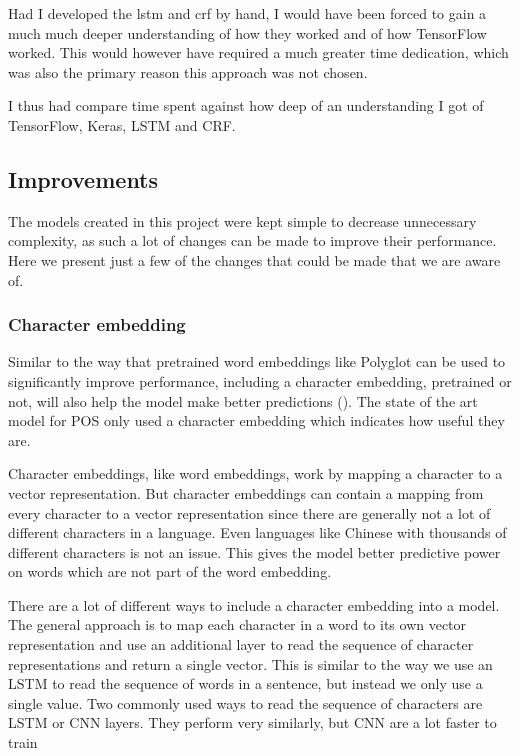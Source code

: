 Had I developed the lstm and crf by hand, I would have been forced to gain a
much much deeper understanding of how they worked and of how TensorFlow worked.
This would however have required a much greater time dedication, which was also
the primary reason this approach was not chosen.

I thus had compare time spent against how deep of an understanding I got of
TensorFlow, Keras, LSTM and CRF\@.

\subsection{Improvements}

The models created in this project were kept simple to decrease unnecessary
complexity, as such a lot of changes can be made to improve their performance.
Here we present just a few of the changes that could be made that we are aware
of.

\subsubsection{Character embedding}

Similar to the way that pretrained word embeddings like Polyglot can be used to
significantly improve performance, including a character embedding, pretrained
or not, will also help the model make better predictions
(\cite{yang2018design}).  The state of the art model for POS only used a
character embedding which indicates how useful they are.

Character embeddings, like word embeddings, work by mapping a character to a
vector representation. But character embeddings can contain a mapping from every
character to a vector representation since there are generally not a lot of
different characters in a language. Even languages like Chinese with thousands
of different characters is not an issue. This gives the model better predictive
power on words which are not part of the word embedding.

There are a lot of different ways to include a character embedding into a model.
The general approach is to map each character in a word to its own vector
representation and use an additional layer to read the sequence of character
representations and return a single vector. This is similar to the way we use an
LSTM to read the sequence of words in a sentence, but instead we only use a
single value. Two commonly used ways to read the sequence of characters are LSTM
or CNN layers. They perform very similarly, but CNN are a lot faster to
train~\cite{yang2018design}

